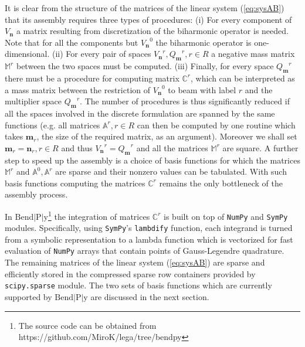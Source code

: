 \documentclass{marine_2015}
\newcommand{\Vh}{\ensuremath{V_{\mathbf{n}}}}
\newcommand{\Qh}{\ensuremath{Q_{\mathbf{m}}}}
\begin{document}
It is clear from the structure of the matrices of the linear system
(\ref{eq:sysAB}) that its assembly requires three types of procedures: (i) For 
every component of $\Vh$ a matrix resulting from discretization of the biharmonic operator is needed.
Note that for all the components but $\Vh^0$ the biharmonic operator is one-dimensional. 
(ii) For every pair of spaces $\Vh^r, \Qh^r, r\in R$ a negative mass
matrix $\mathbb{M}^r$ between the two spaces must be computed. (iii) Finally, for
every space $\Qh^r$ there must be a procedure for computing matrix $\mathbb{C}^r$,
which can be interpreted as a mass matrix between the restriction of $\Vh^0$ to
beam with label $r$ and the multiplier space $\Qh^r$. The number of procedures is 
thus significantly reduced if all the spaces involved in the discrete formulation 
are spanned by the same functions (e.g. all matrices $\mathbb{A}^r, r\in R$ can 
then be computed by one routine which takes $\mathbf{m}_r$, the size of the
required matrix, as an argument). Moreover we shall set $\mathbf{m}_r=\mathbf{n}_r, r\in R$
and thus $\Vh^r=\Qh^r$ and all the matrices $\mathbb{M}^r$ are square. A further 
step to speed up the assembly is a choice of basis functions for which the matrices 
$\mathbb{M}^r$ and $\mathbb{A}^0, \mathbb{A}^r$ are sparse and their nonzero values can be tabulated. With such basis functions 
computing the matrices $\mathbb{C}^r$ remains the only bottleneck of the assembly 
process. 

In $\text{Bend}\!\left|\text{P}\right|\!\text{y}$\footnote{The source code
can be obtained from https://github.com/MiroK/lega/tree/bendpy} the integration of matrices $\mathbb{C}^r$ is built on top of
{\tt{NumPy}}\cite{numpy} and {\tt{SymPy}}\cite{sympy} modules. Specifically, using
{\tt{SymPy}}'s {\tt{lambdify}} function, each integrand is turned from a symbolic 
representation to a lambda function which is vectorized for fast evaluation of 
{\tt{NumPy}} arrays that contain points of Gauss-Legendre quadrature. 
The remaining matrices of the linear system (\ref{eq:sysAB}) are sparse and 
efficiently stored in the compressed sparse row containers provided by {\tt{scipy.sparse}} module.
The two sets of basis functions which are currently supported by $\text{Bend}\!\left|\text{P}\right|\!\text{y}$
are discussed in the next section.
\end{document}

